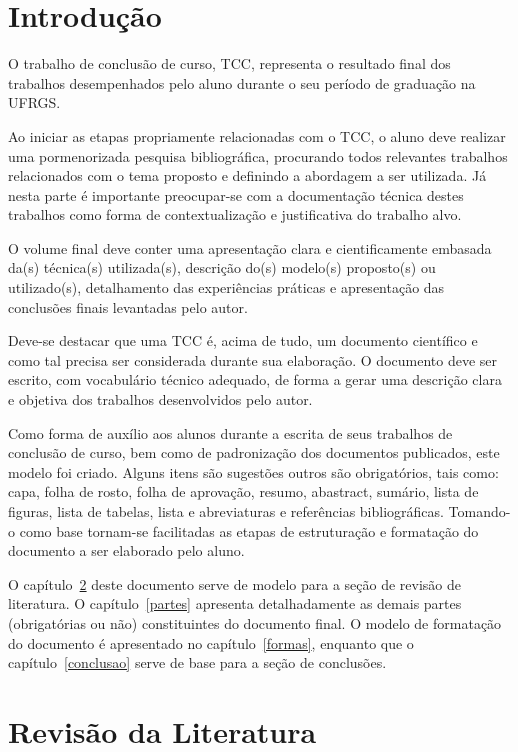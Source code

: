 \documentclass[repeatfields,xlists,xpacks,oneside]{ufrgscca}
\begin{document}

\chapter{Introdução}

O trabalho de conclusão de curso, TCC,  representa o resultado
final dos trabalhos desempenhados pelo aluno durante o seu período de graduação na UFRGS.

Ao iniciar as etapas propriamente relacionadas com o TCC,
o aluno deve realizar uma pormenorizada pesquisa bibliográfica, procurando
todos relevantes trabalhos relacionados com o tema proposto e definindo a
abordagem a ser utilizada. Já nesta parte é importante preocupar-se com a
documentação técnica destes trabalhos como forma de contextualização e
justificativa do trabalho  alvo.

O volume final deve conter uma apresentação clara e cientificamente embasada
da(s) técnica(s) utilizada(s), descrição do(s) modelo(s) proposto(s) ou
utilizado(s), detalhamento das experiências práticas e apresentação das
conclusões finais levantadas pelo autor.

Deve-se destacar que uma TCC é,
acima de tudo, um documento científico e como tal precisa ser considerada
durante sua elaboração. O documento deve ser escrito, com vocabulário
técnico adequado, de forma a gerar uma descrição clara e objetiva dos
trabalhos desenvolvidos pelo autor.

Como forma de auxílio aos alunos durante a escrita de seus trabalhos de conclusão de curso, bem como de padronização dos documentos publicados, este modelo foi criado. Alguns itens são sugestões outros são
obrigatórios, tais como: capa, folha de rosto, folha de aprovação, resumo,
abastract, sumário, lista de figuras, lista de tabelas, lista e abreviaturas
e referências bibliográficas. Tomando-o como base tornam-se facilitadas as
etapas de estruturação e formatação do documento a ser elaborado pelo aluno.

O capítulo~\ref{revisao} deste documento serve de modelo para a seção de
revisão de literatura. O capítulo~\ref{partes} apresenta detalhadamente
as demais partes (obrigatórias ou não) constituintes do documento final. O
modelo de formatação do documento é apresentado no capítulo~\ref{formas},
enquanto que o capítulo~\ref{conclusao} serve de base para a seção de
conclusões.

\chapter{Revisão da Literatura}
\label{revisao}
\end{document}
